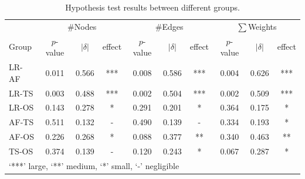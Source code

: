 \documentclass[sigconf]{acmart}
\begin{document}
\begin{table}[!t]
  \centering
  \renewcommand\tabcolsep{2pt}
  \small
  \caption{Hypothesis test results between different groups.}\vspace{-0.3cm}
    \begin{tabular}{lccccccccc}
\toprule
          & \multicolumn{3}{c}{\#Nodes} & \multicolumn{3}{c}{\#Edges} & \multicolumn{3}{c}{$\sum$Weights} \\
    Group & $p$-value & $|\delta|$ & effect & $p$-value & $|\delta|$ & effect & $p$-value & $|\delta|$ & effect\\
\midrule
    LR-AF & 0.011  & 0.566  & *** & 0.008  & 0.586  & *** & 0.004  & 0.626  & *** \\
    LR-TS & 0.003  & 0.488  & *** & 0.002  & 0.504  & *** & 0.002  & 0.509  & *** \\
    LR-OS & 0.143  & 0.278  & * & 0.291  & 0.201  & * & 0.364  & 0.175  & * \\
    AF-TS & 0.511  & 0.132  & - & 0.490  & 0.139  & - & 0.334  & 0.193  & * \\
    AF-OS & 0.226  & 0.268  & * & 0.088 & 0.377  & ** & 0.340  & 0.463  & ** \\
    TS-OS & 0.374  & 0.139  & - & 0.120  & 0.243  & * & 0.067  & 0.287  & * \\
\bottomrule
 \multicolumn{10}{l}{`***' large, `**' medium, `*' small, `-' negligible}\\
    \end{tabular}\vspace{-0.3cm}
  \label{tab:hypo}%
\end{table}










 
\end{document}
